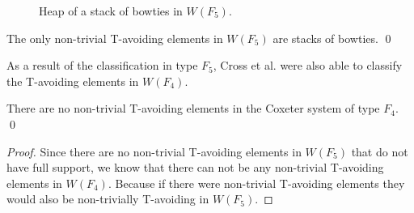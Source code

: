 \begin{figure*}[h!] \centering
{}
\caption{Heap of a stack of bowties in $W(F_5)$.}\label{fig:stackobowties}
\end{figure*}

\begin{theorem}
The only non-trivial T-avoiding elements in $W(F_5)$ are stacks of bowties. \qed	
\end{theorem}


As a result of the classification in type $F_5$, Cross et al. were also able to classify the T-avoiding elements in $W(F_4)$. 

\begin{corollary}
There are no non-trivial T-avoiding elements in the Coxeter system of type $F_4$. \qed	
\begin{proof}
	Since there are no non-trivial T-avoiding elements in $W(F_5)$ that do not have full support, we know that there can not be any non-trivial T-avoiding elements in $W(F_4)$. Because if there were non-trivial T-avoiding elements they would also be non-trivially T-avoiding in $W(F_5)$.
\end{proof}
\end{corollary}

